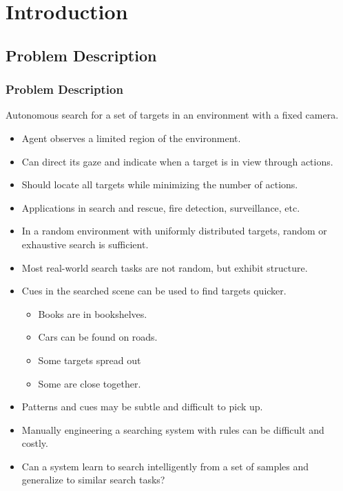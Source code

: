 
\section{Introduction}

\subsection{Problem Description}

\begin{frame}
    \frametitle{Problem Description}
    
    Autonomous search for a set of targets in an environment with a fixed camera.
    
    \begin{itemize}
        \item Agent observes a limited region of the environment. 
        \item Can direct its gaze and indicate when a target is in view through actions.
        \item Should locate all targets while minimizing the number of actions.
        \item Applications in search and rescue, fire detection, surveillance, etc.
    \end{itemize}
\end{frame}

\begin{frame}
    \begin{itemize}
        \item In a random environment with uniformly distributed targets, random or exhaustive search is sufficient.
        \item Most real-world search tasks are not random, but exhibit structure.
        \item Cues in the searched scene can be used to find targets quicker.
        \begin{itemize}
            \item Books are in bookshelves.
            \item Cars can be found on roads.
            \item Some targets spread out
            \item Some are close together.
        \end{itemize}
        \item Patterns and cues may be subtle and difficult to pick up.
        \item Manually engineering a searching system with rules can be difficult and costly.
        \item Can a system learn to search intelligently from a set of samples and generalize to similar search tasks?
    \end{itemize}
\end{frame}


